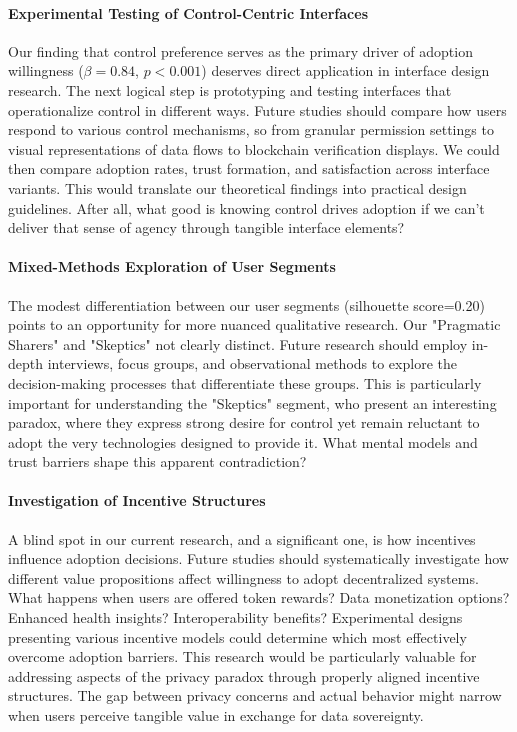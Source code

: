 	\paragraph{Experimental Testing of Control-Centric Interfaces}
	Our finding that control preference serves as the primary driver of adoption willingness ($\beta=0.84$, $p<0.001$) deserves direct application in interface design research. The next logical step is prototyping and testing interfaces that operationalize control in different ways. Future studies should compare how users respond to various control mechanisms, so from granular permission settings to visual representations of data flows to blockchain verification displays. We could then compare adoption rates, trust formation, and satisfaction across interface variants. This would translate our theoretical findings into practical design guidelines. After all, what good is knowing control drives adoption if we can't deliver that sense of agency through tangible interface elements?
	
	\paragraph{Mixed-Methods Exploration of User Segments}
	The modest differentiation between our user segments (silhouette score=0.20) points to an opportunity for more nuanced qualitative research. Our "Pragmatic Sharers" and "Skeptics" not clearly distinct. Future research should employ in-depth interviews, focus groups, and observational methods to explore the decision-making processes that differentiate these groups. This is particularly important for understanding the "Skeptics" segment, who present an interesting paradox, where they express strong desire for control yet remain reluctant to adopt the very technologies designed to provide it. What mental models and trust barriers shape this apparent contradiction?
	
	\paragraph{Investigation of Incentive Structures}
	A blind spot in our current research, and a significant one, is how incentives influence adoption decisions. Future studies should systematically investigate how different value propositions affect willingness to adopt decentralized systems. What happens when users are offered token rewards? Data monetization options? Enhanced health insights? Interoperability benefits? Experimental designs presenting various incentive models could determine which most effectively overcome adoption barriers. This research would be particularly valuable for addressing aspects of the privacy paradox through properly aligned incentive structures. The gap between privacy concerns and actual behavior might narrow when users perceive tangible value in exchange for data sovereignty.
	
